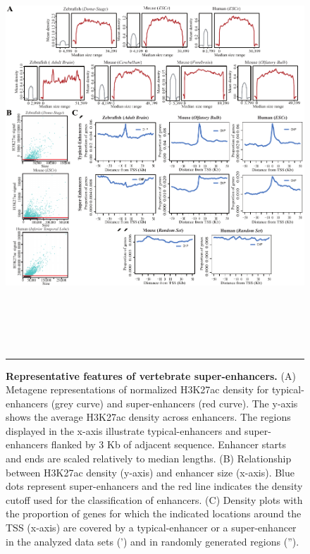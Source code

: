 		\begin{figure}[!h]
			\centering
			\includegraphics[width=16cm,height=15cm]{./figures/Figure_3.pdf}
  			\caption[Features]{\textbf{Representative features of vertebrate super-enhancers.} (A) Metagene representations of normalized H3K27ac density for typical-enhancers (grey curve) and super-enhancers (red curve). The y-axis shows the average H3K27ac density across enhancers. The regions displayed in the x-axis illustrate typical-enhancers and super-enhancers flanked by 3 Kb of adjacent sequence. Enhancer starts and ends are scaled relatively to median lengths. (B) Relationship between H3K27ac density (y-axis) and enhancer size (x-axis). Blue dots represent super-enhancers and the red line indicates the density cutoff used for the classification of enhancers. (C) Density plots with the proportion of genes for which the indicated locations around the TSS (x-axis) are covered by a typical-enhancer or a super-enhancer in the analyzed data sets (') and in randomly generated regions ('').}
			\label{Features}
			\rule{\textwidth}{0.25mm}
		\end{figure}

